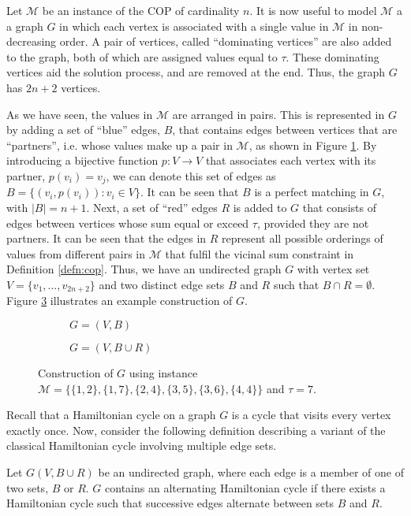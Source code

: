 \documentclass[oribibl]{llncs}
\begin{document}
Let $\mathcal{M}$ be an instance of the COP of cardinality $n$. It is now useful to model $\mathcal{M}$ a a graph $G$ in which each vertex is associated with a single value in $\mathcal{M}$ in non-decreasing order. A pair of vertices, called ``dominating vertices'' are also added to the graph, both of which are assigned values equal to $\tau$. These dominating vertices aid the solution process, and are removed at the end. Thus, the graph $G$ has $2n+2$ vertices.

As we have seen, the values in $\mathcal{M}$ are arranged in pairs. This is represented in $G$ by adding a set of ``blue'' edges, $B$, that contains edges between vertices that are ``partners'', i.e. whose values make up a pair in $\mathcal{M}$, as shown in Figure \ref{fig:partners}. By introducing a bijective function $p: V \to V$ that associates each vertex with its partner, $p(v_i) = v_j$, we can denote this set of edges as $B = \{(v_i, p(v_i)) : v_i \in V\}$. It can be seen that $B$ is a perfect matching in $G$, with $|B| = n+1$. Next, a set of ``red'' edges $R$ is added to $G$ that consists of edges between vertices whose sum equal or exceed $\tau$, provided they are not partners. It can be seen that the edges in $R$ represent all possible orderings of values from different pairs in $\mathcal{M}$ that fulfil the vicinal sum constraint in Definition \ref{defn:cop}. Thus, we have an undirected graph $G$ with vertex set $V = \{v_1, ..., v_{2n+2}\}$ and two distinct edge sets $B$ and $R$ such that $B \cap R = \emptyset$. Figure \ref{fig:partners/threshold} illustrates an example construction of $G$.
\begin{figure}	
\centering
\begin{subfigure}[h]{0.45\textwidth}
	
	\caption{$G = (V, B)$}	
	\label{fig:partners}
\end{subfigure} \hspace{40pt}
\begin{subfigure}[h]{0.45\textwidth}
	
	\caption{$G=(V, B \cup R)$}	
	\label{fig:threshold}
\end{subfigure}
\caption{Construction of $G$ using instance $\mathcal{M} = \{\{1,2\}, \{1,7\}, \{2,4\}, \{3,5\}, \{3,6\}, \{4,4\}\}$ and $\tau = 7$.}
\label{fig:partners/threshold}
\end{figure}

Recall that a Hamiltonian cycle on a graph $G$ is a cycle that visits every vertex exactly once. Now, consider the following definition describing a variant of the classical Hamiltonian cycle involving multiple edge sets.
\begin{definition}
	\label{defn:althamcycle}
	Let $G(V, B\cup R)$ be an undirected graph, where each edge is a member of one of two sets, $B$ or $R$. $G$ contains an alternating Hamiltonian cycle if there exists a Hamiltonian cycle such that successive edges alternate between sets $B$ and $R$.
\end{definition}
\end{document}
